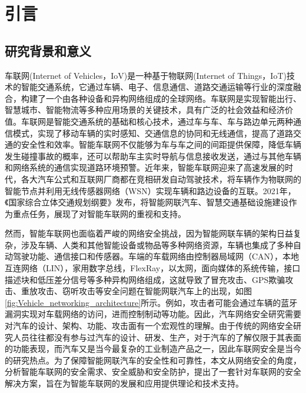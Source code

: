 \setlength{\baselineskip}{20pt}
\chapter{引言}
\label{cha:intro}


\section{研究背景和意义}

车联网(Internet of Vehicles，IoV)是一种基于物联网(Internet of Things，IoT)技术的智能交通系统，它通过车辆、电子、信息通信、道路交通运输等行业的深度融合，构建了一个由各种设备和异构网络组成的全球网络\cite{Architecture_Protocols_and_Security_in_IoV}。车联网是实现智能出行、智慧城市、智能物流等多种应用场景的关键技术，具有广泛的社会效益和经济价值。车联网是智能交通系统的基础和核心技术，通过车与车、车与路边单元两种通信模式，实现了移动车辆的实时感知、交通信息的协同和无线通信，提高了道路交通的安全性和效率。智能车联网不仅能够为车与车之间的间距提供保障，降低车辆发生碰撞事故的概率，还可以帮助车主实时导航与信息接收发送，通过与其他车辆和网络系统的通信实现道路环境预警。近年来，智能车联网迎来了高速发展的时代，各大汽车公式和互联网厂商都在竞相研发自动驾驶技术\cite{ref1}，将车辆作为物联网的智能节点\cite{ref2}并利用无线传感器网络（WSN）实现车辆和路边设备的互联。2021年，《国家综合立体交通规划纲要》发布，将智能网联汽车、智慧交通基础设施建设作为重点任务，展现了对智能车联网的重视和支持。

然而，智能车联网也面临着严峻的网络安全挑战，因为智能网联车辆的架构日益复杂，涉及车辆、人类和其他智能设备或物品等多种网络资源\cite{Attacks_and_countermeasures_in_the_internet_of_vehicles,Attack_IOV2}，车辆也集成了多种自动驾驶功能、通信接口和传感器。车端的车载网络由控制器局域网（CAN），本地互连网络（LIN），家用数字总线，FlexRay，以太网，面向媒体的系统传输，接口描述块和低压差分信号等多种异构网络组成\cite{Cybersecurity_for_autonomous_vehicles_Review_of_attacks_and_defense}，这就导致了冒充攻击、GPS欺骗攻击、重放攻击、窃听攻击等安全问题在智能网联汽车上的出现\cite{ref3,ref4,Architecture_Protocols_and_Security_in_IoV}，如图\ref{fig:Vehicle_networking_architecture}所示。例如，攻击者可能会通过车辆的蓝牙漏洞实现对车载网络的访问，进而控制制动等功能。因此，汽车网络安全研究需要对汽车的设计、架构、功能、攻击面有一个宏观性的理解。由于传统的网络安全研究人员往往都没有参与过汽车的设计、研发、生产，对于汽车的了解仅限于其表面的功能表现，而汽车又是当今最复杂的工业制造产品之一，因此车联网安全是当今的研究热点。为了保障智能网联汽车的安全性和可靠性，本文从网络安全的角度，分析智能车联网的安全需求、安全威胁和安全防护，提出了一套针对车联网的安全解决方案，旨在为智能车联网的发展和应用提供理论和技术支持。

